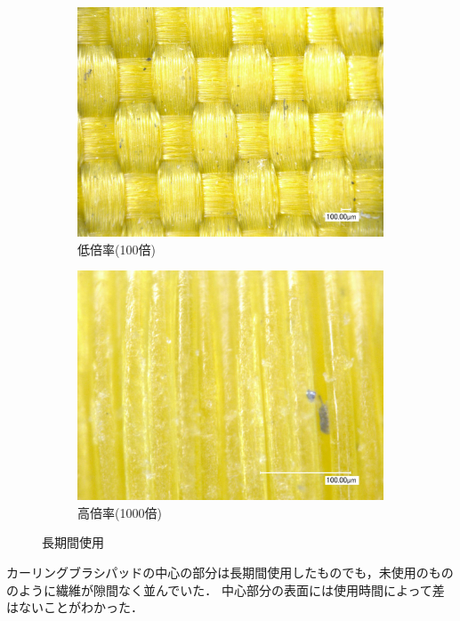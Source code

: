 \documentclass[main]{subfiles}
\begin{document}
\begin{figure}[H]
    \centering
    \begin{subfigure}[htbp]{0.45\linewidth}
        \centering
        \includegraphics[keepaspectratio, width=0.8\linewidth]{figures/中心/カーリングパッド長期低倍率.jpg}
        \caption{低倍率(100倍)}
        \label{fig:label}
    \end{subfigure}
    \begin{subfigure}[htbp]{0.45\linewidth}
        \centering
        \includegraphics[keepaspectratio, width=0.8\linewidth]{figures/中心/カーリングパッド長期.jpg}
        \caption{高倍率(1000倍)}
        \label{fig:label}
    \end{subfigure}
    \caption{長期間使用}
    \label{fig:label}
\end{figure}


カーリングブラシパッドの中心の部分は長期間使用したものでも，未使用のもののように繊維が隙間なく並んでいた．
中心部分の表面には使用時間によって差はないことがわかった．
\end{document}
